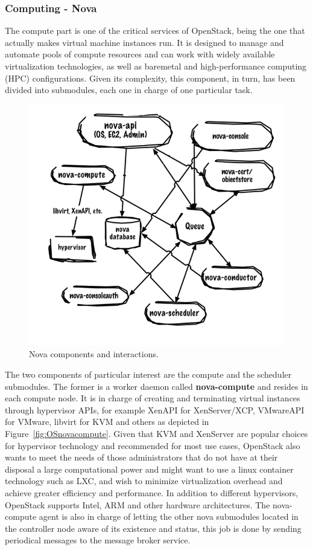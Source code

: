 \subsubsection{Computing - Nova}
\label{sec:nova}
The compute part is one of the critical services of OpenStack, being the one that actually makes virtual machine instances run.
It is designed to manage and automate pools of compute resources and can work with widely available virtualization technologies, as well as baremetal and high-performance computing (HPC) configurations.
Given its complexity, this component, in turn, has been divided into submodules, each one in charge of one particular task.
\begin{figure}[h]
	\centering
	\includegraphics[clip= true, width= 0.6 \columnwidth]{images/nova_components.png}
	\caption{Nova components and interactions.}
	\label{fig:OSnovalogical}
\end{figure}
The two components of particular interest are the compute and the scheduler submodules.
The former is a worker daemon called \textbf{nova-compute} and resides in each compute node. It is in charge of creating and terminating virtual instances through hypervisor APIs, for example XenAPI for XenServer/XCP, VMwareAPI for VMware, libvirt for KVM and others as depicted in Figure~\ref{fig:OSnovacompute}.
Given that KVM and XenServer are popular choices for hypervisor technology and recommended for most use cases, OpenStack also wants to meet the needs of those administrators that do not have at their disposal a large computational power and might want to use a linux container technology such as LXC, and wish to minimize virtualization overhead and achieve greater efficiency and performance. In addition to different hypervisors, OpenStack supports Intel, ARM and other hardware architectures.
The nova-compute agent is also in charge of letting the other nova submodules located in the controller node aware of its existence and status, this job is done by sending periodical messages to the message broker service.
